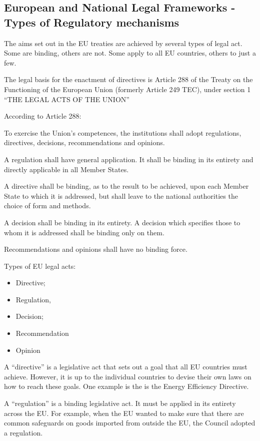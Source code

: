 \documentclass[]{book}
\theoremstyle{definition}
\theoremstyle{definition}
\theoremstyle{definition}
\theoremstyle{remark}
\begin{document}
\subsection{European and National Legal Frameworks - Types of Regulatory
mechanisms}\label{european-and-national-legal-frameworks---types-of-regulatory-mechanisms}

The aims set out in the EU treaties are achieved by several types of
legal act. Some are binding, others are not. Some apply to all EU
countries, others to just a few.

The legal basis for the enactment of directives is Article 288 of the
Treaty on the Functioning of the European Union (formerly Article 249
TEC), under section 1 ``THE LEGAL ACTS OF THE UNION''

According to Article 288:

To exercise the Union's competences, the institutions shall adopt
regulations, directives, decisions, recommendations and opinions.

A regulation shall have general application. It shall be binding in its
entirety and directly applicable in all Member States.

A directive shall be binding, as to the result to be achieved, upon each
Member State to which it is addressed, but shall leave to the national
authorities the choice of form and methods.

A decision shall be binding in its entirety. A decision which specifies
those to whom it is addressed shall be binding only on them.

Recommendations and opinions shall have no binding force.

Types of EU legal acts:

\begin{itemize}
\item
  Directive;
\item
  Regulation,
\item
  Decision;
\item
  Recommendation
\item
  Opinion
\end{itemize}

A ``directive'' is a legislative act that sets out a goal that all EU
countries must achieve. However, it is up to the individual countries to
devise their own laws on how to reach these goals. One example is the is
the Energy Efficiency Directive.

A ``regulation'' is a binding legislative act. It must be applied in its
entirety across the EU. For example, when the EU wanted to make sure
that there are common safeguards on goods imported from outside the EU,
the Council adopted a regulation.
\end{document}
